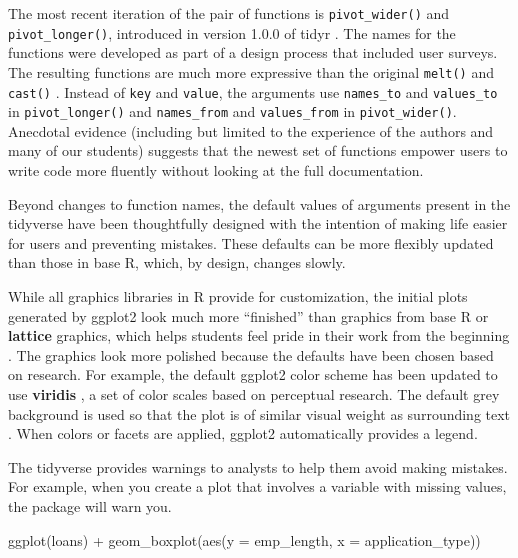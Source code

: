 \documentclass[12pt]{article}
\newenvironment{Shaded}{\begin{snugshade}}{\end{snugshade}}
\newcommand{\AttributeTok}[1]{\textcolor[rgb]{0.77,0.63,0.00}{#1}}
\newcommand{\FunctionTok}[1]{\textcolor[rgb]{0.00,0.00,0.00}{#1}}
\newcommand{\NormalTok}[1]{#1}
\newcommand{\SpecialCharTok}[1]{\textcolor[rgb]{0.00,0.00,0.00}{#1}}
\begin{document}
The most recent iteration of the pair of functions is
\texttt{pivot\_wider()} and \texttt{pivot\_longer()}, introduced in
version 1.0.0 of tidyr \citep{R-tidyr}. The names for the functions were
developed as part of a design process that included user surveys. The
resulting functions are much more expressive than the original
\texttt{melt()} and \texttt{cast()} \citep{pivot-tweet}. Instead of
\texttt{key} and \texttt{value}, the arguments use \texttt{names\_to}
and \texttt{values\_to} in \texttt{pivot\_longer()} and
\texttt{names\_from} and \texttt{values\_from} in
\texttt{pivot\_wider()}. Anecdotal evidence (including but limited to
the experience of the authors and many of our students) suggests that
the newest set of functions empower users to write code more fluently
without looking at the full documentation.

Beyond changes to function names, the default values of arguments
present in the tidyverse have been thoughtfully designed with the
intention of making life easier for users and preventing mistakes. These
defaults can be more flexibly updated than those in base R, which, by
design, changes slowly.

While all graphics libraries in R provide for customization, the initial
plots generated by ggplot2 look much more ``finished'' than graphics
from base R or \textbf{lattice} \citep{R-lattice} graphics, which helps
students feel pride in their work from the beginning
\citep{myint2020comparison}. The graphics look more polished because the
defaults have been chosen based on research. For example, the default
ggplot2 color scheme has been updated to use \textbf{viridis}
\citep{R-viridis}, a set of color scales based on perceptual research.
The default grey background is used so that the plot is of similar
visual weight as surrounding text \citep{Wic2021}. When colors or facets
are applied, ggplot2 automatically provides a legend.

The tidyverse provides warnings to analysts to help them avoid making
mistakes. For example, when you create a plot that involves a variable
with missing values, the package will warn you.

\linespread{1}

\begin{Shaded}
\begin{Highlighting}[]
\FunctionTok{ggplot}\NormalTok{(loans) }\SpecialCharTok{+} 
  \FunctionTok{geom\_boxplot}\NormalTok{(}\FunctionTok{aes}\NormalTok{(}\AttributeTok{y =}\NormalTok{ emp\_length, }\AttributeTok{x =}\NormalTok{ application\_type))}
\end{Highlighting}
\end{Shaded}
\end{document}
